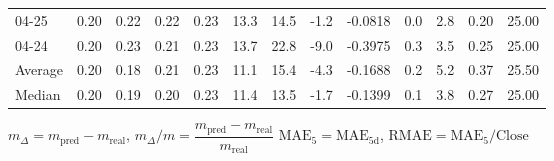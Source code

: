 \begin{threeparttable}
{\begin{tabular}{lrrrrrrrrrrrr}
  04-25 &          0.20 &          0.22 &          0.22 &        0.23 &                13.3 &                14.5 &       -1.2 &      -0.0818 &                 0.0 &              2.8 &            0.20 &                  25.00 \\
  04-24 &          0.20 &          0.23 &          0.21 &        0.23 &                13.7 &                22.8 &       -9.0 &      -0.3975 &                 0.3 &              3.5 &            0.25 &                  25.00 \\
Average &          0.20 &          0.18 &          0.21 &        0.23 &                11.1 &                15.4 &       -4.3 &      -0.1688 &                 0.2 &              5.2 &            0.37 &                  25.50 \\
 Median &          0.20 &          0.19 &          0.20 &        0.23 &                11.4 &                13.5 &       -1.7 &      -0.1399 &                 0.1 &              3.8 &            0.27 &                  25.00 \\
\bottomrule
\end{tabular}
}
\begin{tablenotes}\footnotesize
\item $m_\Delta=m_{\text{pred}}-m_{\text{real}}$,
$m_\Delta/m=\dfrac{m_{\text{pred}}-m_{\text{real}}}{m_{\text{real}}}$
$\mathrm{MAE}_5=\mathrm{MAE}_{5\text{d}}$,
$\mathrm{RMAE}=\mathrm{MAE}_5/\text{Close}$
\end{tablenotes}
\end{threeparttable}
\endgroup

